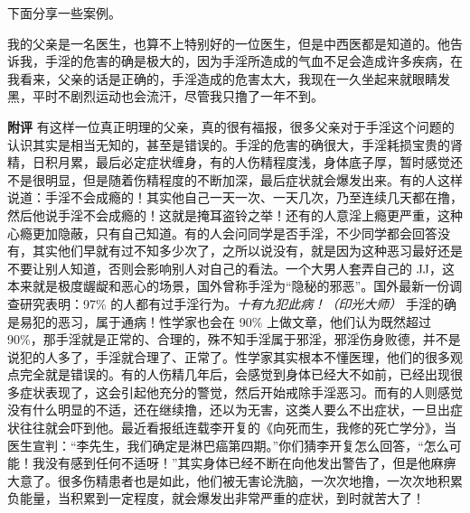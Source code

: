 下面分享一些案例。

\begin{case}
    我的父亲是一名医生，也算不上特别好的一位医生，但是中西医都是知道的。他告诉我，手淫的危害的确是极大的，因为手淫所造成的气血不足会造成许多疾病，在我看来，父亲的话是正确的，手淫造成的危害太大，我现在一久坐起来就眼睛发黑，平时不剧烈运动也会流汗，尽管我只撸了一年不到。

    \textbf{附评} 有这样一位真正明理的父亲，真的很有福报，很多父亲对于手淫这个问题的认识其实是相当无知的，甚至是错误的。手淫的危害的确很大，手淫耗损宝贵的肾精，日积月累，最后必定症状缠身，有的人伤精程度浅，身体底子厚，暂时感觉还不是很明显，但是随着伤精程度的不断加深，最后症状就会爆发出来。有的人这样说道：手淫不会成瘾的！其实他自己一天一次、一天几次，乃至连续几天都在撸，然后他说手淫不会成瘾的！这就是掩耳盗铃之举！还有的人意淫上瘾更严重，这种心瘾更加隐蔽，只有自己知道。有的人会问同学是否手淫，不少同学都会回答没有，其实他们早就有过不知多少次了，之所以说没有，就是因为这种恶习最好还是不要让别人知道，否则会影响别人对自己的看法。一个大男人套弄自己的 JJ，这本来就是极度龌龊和恶心的场景，国外曾称手淫为“隐秘的邪恶”。国外最新一份调查研究表明：97\% 的人都有过手淫行为。\textit{十有九犯此病！（印光大师）} 手淫的确是易犯的恶习，属于通病！性学家也会在 90\% 上做文章，他们认为既然超过 90\%，那手淫就是正常的、合理的，殊不知手淫属于邪淫，邪淫伤身败德，并不是说犯的人多了，手淫就合理了、正常了。性学家其实根本不懂医理，他们的很多观点完全就是错误的。有的人伤精几年后，会感觉到身体已经大不如前，已经出现很多症状表现了，这会引起他充分的警觉，然后开始戒除手淫恶习。而有的人则感觉没有什么明显的不适，还在继续撸，还以为无害，这类人要么不出症状，一旦出症状往往就会吓到他。最近看报纸连载李开复的《向死而生，我修的死亡学分》，当医生宣判：“李先生，我们确定是淋巴癌第四期。”你们猜李开复怎么回答，“怎么可能！我没有感到任何不适呀！”其实身体已经不断在向他发出警告了，但是他麻痹大意了。很多伤精患者也是如此，他们被无害论洗脑，一次次地撸，一次次地积累负能量，当积累到一定程度，就会爆发出非常严重的症状，到时就苦大了！
\end{case}

